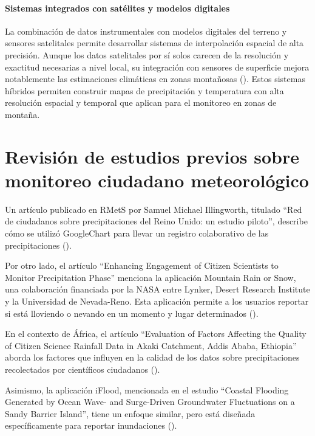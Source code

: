 \paragraph{Sistemas integrados con satélites y modelos digitales}

La combinación de datos instrumentales con modelos digitales del terreno y sensores satelitales permite desarrollar sistemas de interpolación espacial de alta precisión. Aunque los datos satelitales por sí solos carecen de la resolución y exactitud necesarias a nivel local, su integración con sensores de superficie mejora notablemente las estimaciones climáticas en zonas montañosas  (\cite{lei2022combining}). Estos sistemas híbridos permiten construir mapas de precipitación y temperatura con alta resolución espacial y temporal que aplican para el monitoreo en zonas de montaña.



\section{Revisión de estudios previos sobre monitoreo ciudadano meteorológico}

Un artículo publicado en RMetS por Samuel Michael Illingworth, titulado ``Red de ciudadanos sobre precipitaciones del Reino Unido: un estudio piloto'', describe cómo se utilizó GoogleChart para llevar un registro colaborativo de las precipitaciones (\cite{illingworth2021ukprecipitation}).

Por otro lado, el artículo ``Enhancing Engagement of Citizen Scientists to Monitor Precipitation Phase'' menciona la aplicación Mountain Rain or Snow, una colaboración financiada por la NASA entre Lynker, Desert Research Institute y la Universidad de Nevada-Reno. Esta aplicación permite a los usuarios reportar si está lloviendo o nevando en un momento y lugar determinados (\cite{lute2021enhancing}).


En el contexto de África, el artículo ``Evaluation of Factors Affecting the Quality of Citizen Science Rainfall Data in Akaki Catchment, Addis Ababa, Ethiopia'' aborda los factores que influyen en la calidad de los datos sobre precipitaciones recolectados por científicos ciudadanos (\cite{tedla2022evaluation}).

Asimismo, la aplicación iFlood, mencionada en el estudio ``Coastal Flooding Generated by Ocean Wave- and Surge-Driven Groundwater Fluctuations on a Sandy Barrier Island'', tiene un enfoque similar, pero está diseñada específicamente para reportar inundaciones (\cite{elgar2021coastal}). 


